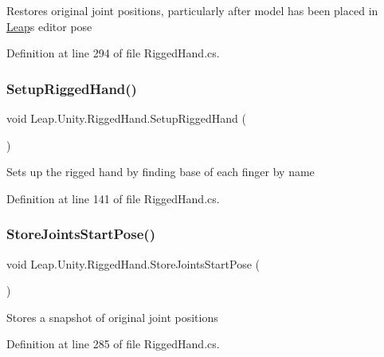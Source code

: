 Restores original joint positions, particularly after model has been placed in \mbox{\hyperlink{namespace_leap_1_1_unity_1_1_leap}{Leap}}\textquotesingle{}s editor pose 

Definition at line 294 of file Rigged\+Hand.\+cs.

\mbox{\label{class_leap_1_1_unity_1_1_rigged_hand_a5a1c018bad50c06259998bdccbc2c513}} 
\subsubsection{\texorpdfstring{SetupRiggedHand()}{SetupRiggedHand()}}
{\footnotesize\ttfamily void Leap.\+Unity.\+Rigged\+Hand.\+Setup\+Rigged\+Hand (\begin{DoxyParamCaption}{ }\end{DoxyParamCaption})}

Sets up the rigged hand by finding base of each finger by name 

Definition at line 141 of file Rigged\+Hand.\+cs.

\mbox{\label{class_leap_1_1_unity_1_1_rigged_hand_ae59cd89a5a3b39f56be3b8db74030fa5}} 
\subsubsection{\texorpdfstring{StoreJointsStartPose()}{StoreJointsStartPose()}}
{\footnotesize\ttfamily void Leap.\+Unity.\+Rigged\+Hand.\+Store\+Joints\+Start\+Pose (\begin{DoxyParamCaption}{ }\end{DoxyParamCaption})}

Stores a snapshot of original joint positions 

Definition at line 285 of file Rigged\+Hand.\+cs.

\mbox{\label{class_leap_1_1_unity_1_1_rigged_hand_aa44bd1ae715125809d5803b293eb1bee}} 

